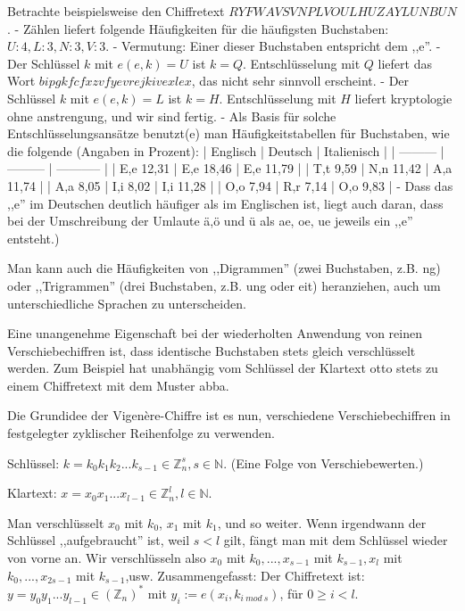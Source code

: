 \documentclass[a4paper]{article}
\begin{document}
\begin{multicols}{3}
    Betrachte beispielsweise den Chiffretext $RYFWAVSVNPLVOULHUZAYLUNBUN$.
    - Zählen liefert folgende Häufigkeiten für die häufigsten Buchstaben: $U:4,L:3,N:3,V:3$.
    - Vermutung: Einer dieser Buchstaben entspricht dem ,,e''.
    - Der Schlüssel $k$ mit $e(e,k)=U$ ist $k=Q$. Entschlüsselung mit $Q$ liefert das Wort $bipgkfcfxzvfyevrejkivexlex$, das nicht sehr sinnvoll erscheint.
    - Der Schlüssel $k$ mit $e(e,k)=L$ ist $k=H$. Entschlüsselung mit $H$ liefert kryptologie ohne anstrengung, und wir sind fertig.
    - Als Basis für solche Entschlüsselungsansätze benutzt(e) man Häufigkeitstabellen für Buchstaben, wie die folgende (Angaben in Prozent):
    | Englisch  | Deutsch   | Italienisch |
    | --------- | --------- | ----------- |
    | E,e 12,31 | E,e 18,46 | E,e 11,79   |
    | T,t 9,59  | N,n 11,42 | A,a 11,74   |
    | A,a 8,05  | I,i 8,02  | I,i 11,28   |
    | O,o 7,94  | R,r 7,14  | O,o 9,83    |
    - Dass das ,,e'' im Deutschen deutlich häufiger als im Englischen ist, liegt auch daran, dass bei der Umschreibung der Umlaute ä,ö und ü als ae, oe, ue jeweils ein ,,e'' entsteht.)

    Man kann auch die Häufigkeiten von ,,Digrammen'' (zwei Buchstaben, z.B. ng) oder ,,Trigrammen''  (drei Buchstaben, z.B. ung oder eit) heranziehen, auch um unterschiedliche Sprachen zu unterscheiden.

    Eine unangenehme Eigenschaft bei der wiederholten Anwendung von reinen Verschiebechiffren ist, dass identische Buchstaben stets gleich verschlüsselt werden. Zum Beispiel hat unabhängig vom Schlüssel der Klartext otto stets zu einem Chiffretext mit dem Muster abba.

    Die Grundidee der Vigenère-Chiffre ist es nun, verschiedene Verschiebechiffren in festgelegter zyklischer Reihenfolge zu verwenden.

    Schlüssel: $k=k_0 k_1 k_2 ...k_{s-1}\in\mathbb{Z}^s_n,s\in\mathbb{N}$. (Eine Folge von Verschiebewerten.)

    Klartext: $x=x_0 x_1...x_{l-1} \in\mathbb{Z}^l_n,l\in\mathbb{N}$.

    Man verschlüsselt $x_0$ mit $k_0$, $x_1$ mit $k_1$, und so weiter. Wenn irgendwann der Schlüssel ,,aufgebraucht'' ist, weil $s<l$ gilt, fängt man mit dem Schlüssel wieder von vorne an. Wir verschlüsseln also $x_0$ mit $k_0,...,x_{s-1}$ mit $k_{s-1},x_l$ mit $k_0,...,x_{2s-1}$ mit $k_{s-1}$,usw.
    Zusammengefasst: Der Chiffretext ist: $y=y_0 y_1...y_{l-1}\in(\mathbb{Z}_n)^*$ mit $y_i:=e(x_i,k_{i\ mod\ s})$, für $0\geq i < l$.


\end{multicols}
\end{document}
